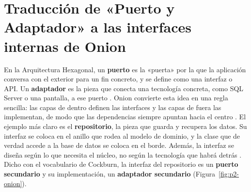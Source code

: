\section{Traducción de «Puerto y Adaptador» a las interfaces internas de Onion}

En la Arquitectura Hexagonal, un \textbf{puerto} es la «puerta» por la que la aplicación conversa con el exterior para un fin concreto, y se define como una interfaz o API. Un \textbf{adaptador} es la pieza que conecta una tecnología concreta, como SQL Server o una pantalla, a ese puerto \citep[«Nature of the Solution»]{cockburn2005}. Onion convierte esta idea en una regla sencilla: las capas de dentro definen las interfaces y las capas de fuera las implementan, de modo que las dependencias siempre apuntan hacia el centro \citep{palermo2008c}. El ejemplo más claro es el \textbf{repositorio}, la pieza que guarda y recupera los datos. Su interfaz se coloca en el anillo que rodea al modelo de dominio, y la clase que de verdad accede a la base de datos se coloca en el borde. Además, la interfaz se diseña según lo que necesita el núcleo, no según la tecnología que habrá detrás \citep{palermo2008}. Dicho con el vocabulario de Cockburn, la interfaz del repositorio es un \textbf{puerto secundario} y su implementación, un \textbf{adaptador secundario} (Figura~\ref{fig:p2-onion}).

